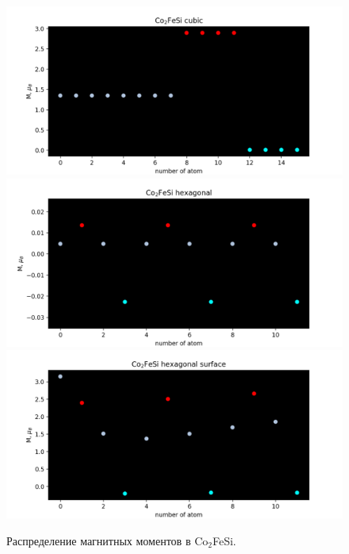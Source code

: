 \documentclass[]{article}
\begin{document}
\begin{figure}[h]
    \centering
    \includegraphics[scale=0.5]{images/co2fesi-cubic-100920_magn_3.png}
    \includegraphics[scale=0.5]{images/co2fesi-hex-100920_magn_3.png}
    \includegraphics[scale=0.5]{images/co2fesi-hex-surf-100920_magn_3.png}
    \caption{Распределение магнитных моментов в Co$_2$FeSi. }
    \label{fig:magn1}
\end{figure}
\end{document}
